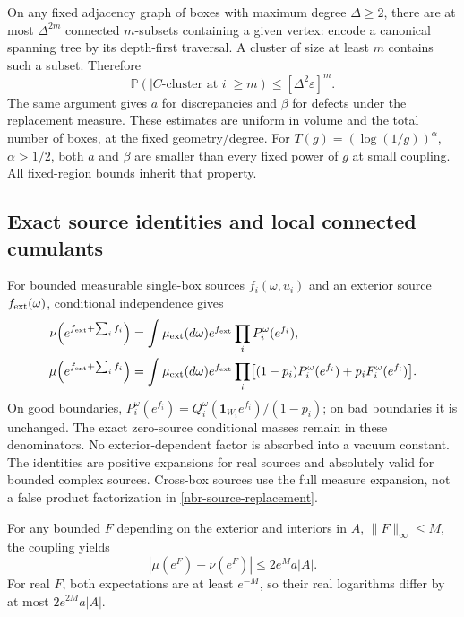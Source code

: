 \documentclass[11pt]{article}
\theoremstyle{remark}
\begin{document}
On any fixed adjacency graph of boxes with maximum degree
\(\Delta\ge2\), there are at most \(\Delta^{2m}\) connected
\(m\)-subsets containing a given vertex: encode a canonical spanning
tree by its depth-first traversal. A cluster of size at least \(m\)
contains such a subset. Therefore
\begin{equation}
 \mathbb P(|C\text{-cluster at }i|\ge m)
       \le[\Delta^2\varepsilon]^m.
 \label{nbr-cluster}
\end{equation}
The same argument gives \(a\) for discrepancies and \(\beta\) for
defects under the replacement measure. These estimates are uniform
in volume and the total number of boxes, at the fixed geometry/degree.
For \(T(g)=(\log(1/g))^\alpha\), \(\alpha>1/2\), both \(a\)
and \(\beta\) are smaller than every fixed power of \(g\) at small
coupling. All fixed-region bounds inherit that property.

\subsection{Exact source identities and local connected cumulants}
\label{nbr-source-section}

For bounded measurable single-box sources \(f_i(\omega,u_i)\) and an
exterior source \(f_{\rm ext}(\omega)\), conditional independence gives
\begin{align}
 \nu\!\left(e^{f_{\rm ext}+\sum_i f_i}\right)
 &=\int\mu_{\rm ext}(d\omega)e^{f_{\rm ext}}
                             \prod_iP_i^\omega(e^{f_i}),
 \label{nbr-source-replacement}\\
 \mu\!\left(e^{f_{\rm ext}+\sum_i f_i}\right)
 &=\int\mu_{\rm ext}(d\omega)e^{f_{\rm ext}}
       \prod_i\bigl[(1-p_i)P_i^\omega(e^{f_i})
                           +p_iF_i^\omega(e^{f_i})\bigr].
 \label{nbr-source-original}
\end{align}
On good boundaries,
\(P_i^\omega(e^{f_i})=Q_i^\omega(\mathbf1_{W_i}e^{f_i})/(1-p_i)\);
on bad boundaries it is unchanged. The exact zero-source conditional
masses remain in these denominators. No exterior-dependent factor is
absorbed into a vacuum constant. The identities are positive expansions
for real sources and absolutely valid for bounded complex sources.
Cross-box sources use the full measure expansion, not a false product
factorization in \eqref{nbr-source-replacement}.

For any bounded \(F\) depending on the exterior and interiors in \(A\),
\(\|F\|_\infty\le M\), the coupling yields
\begin{equation}
 |\mu(e^F)-\nu(e^F)|\le2e^M a|A|.
 \label{nbr-source-difference}
\end{equation}
For real \(F\), both expectations are at least \(e^{-M}\), so their
real logarithms differ by at most \(2e^{2M}a|A|\).
\end{document}
